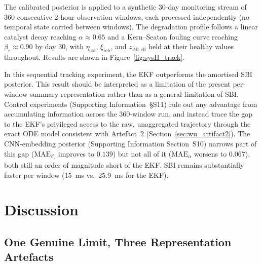 \documentclass[aps,pre,twocolumn,superscriptaddress,floatfix]{revtex4-2}
\begin{document}
The calibrated  posterior is applied to a synthetic 30-day
monitoring stream of 360 consecutive 2-hour observation windows, each
processed independently (no temporal state carried between windows). The
degradation profile follows a linear catalyst decay reaching $\alpha \approx
0.65$ and a Kern--Seaton fouling curve reaching $\beta_r \approx 0.90$ by day
30, with $\eta_\mathrm{col}$, $\xi_\mathrm{reb}$, and $z_{A0,\mathrm{eff}}$
held at their healthy values throughout. Results are shown in 
Figure~\ref{fig:sysII_track}.

In this sequential tracking experiment, the EKF outperforms the amortised SBI
posterior. This result should be interpreted as a limitation of the present
per-window summary representation rather than as a general limitation of SBI. 
Control experiments (Supporting
Information~\S{}S11) rule out any advantage from accumulating information
across the 360-window run, and instead trace the gap to the EKF's privileged
access to the raw, unaggregated trajectory through the exact ODE model
consistent with Artefact~2 (Section~\ref{sec:wu_artifact2}). The CNN-embedding
posterior (Supporting Information Section~S10) narrows part of this gap
($\mathrm{MAE}_{\beta_r}$ improves to $0.139$) but not all of it
($\mathrm{MAE}_\alpha$ worsens to $0.067$), both still an order of magnitude
short of the EKF. SBI remains substantially faster per window (15~ms vs.\
25.9~ms for the EKF). %


\section{Discussion}
\label{sec:discussion}

\subsection{One Genuine Limit, Three Representation Artefacts}
\label{sec:disc_limit_artefacts}
\end{document}
